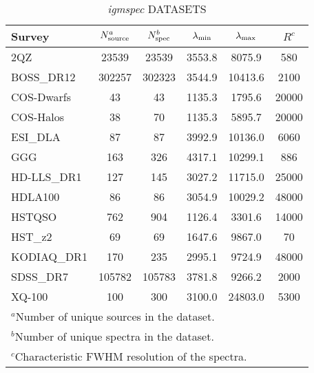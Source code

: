 \clearpage
\begin{table}[ht]
\caption{{\it igmspec} DATASETS \label{tab:datasets}}
\begin{tabular}{lccccc}
Survey & $N_{\rm source}^a$ 
& $N_{\rm spec}^b$ & $\lambda_{\rm min}$
& $\lambda_{\rm max}$ & $R^c$ \\ 
\hline 
2QZ& 23539& 23539& 3553.8& 8075.9& 580\\ 
BOSS\_DR12& 302257& 302323& 3544.9& 10413.6& 2100\\ 
COS-Dwarfs& 43& 43& 1135.3& 1795.6& 20000\\ 
COS-Halos& 38& 70& 1135.3& 5895.7& 20000\\ 
ESI\_DLA& 87& 87& 3992.9& 10136.0& 6060\\ 
GGG& 163& 326& 4317.1& 10299.1& 886\\ 
HD-LLS\_DR1& 127& 145& 3027.2& 11715.0& 25000\\ 
HDLA100& 86& 86& 3054.9& 10029.2& 48000\\ 
HSTQSO& 762& 904& 1126.4& 3301.6& 14000\\ 
HST\_z2& 69& 69& 1647.6& 9867.0& 70\\ 
KODIAQ\_DR1& 170& 235& 2995.1& 9724.9& 48000\\ 
SDSS\_DR7& 105782& 105783& 3781.8& 9266.2& 2000\\ 
XQ-100& 100& 300& 3100.0& 24803.0& 5300\\ 
\hline 
\multicolumn{6}{l}{{$^a$}{Number of unique sources in the dataset. }} \\ 
\multicolumn{6}{l}{{$^b$}{Number of unique spectra in the dataset. }} \\ 
\multicolumn{6}{l}{{$^c$}{Characteristic FWHM resolution of the spectra. }} \\ 
\end{tabular} 
\end{table} 
